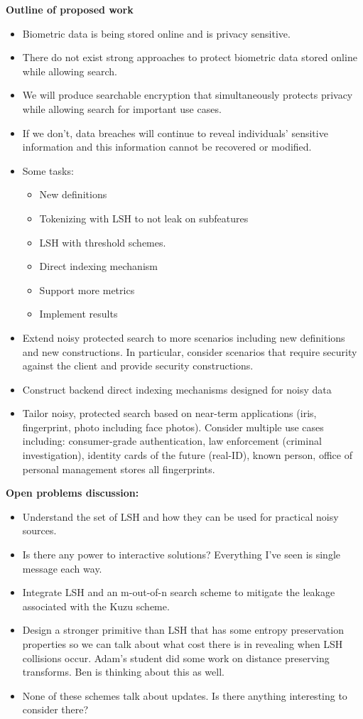 \textbf{Outline of proposed work}
\begin{itemize}
\item Biometric data is being stored online and is privacy sensitive.
\item There do not exist strong approaches to protect biometric data stored online while allowing search.
\item We will produce searchable encryption that simultaneously protects privacy while allowing search for important use cases.
\item If we don't, data breaches will continue to reveal individuals' sensitive information and this information cannot be recovered or modified.
\item Some tasks:
\begin{itemize}
\item New definitions
\item Tokenizing with LSH to not leak on subfeatures
\item LSH with threshold schemes.
\item Direct indexing mechanism
\item Support more metrics
\item Implement results
\end{itemize}
\item Extend noisy protected search to more scenarios including new definitions and new constructions.  In particular, consider scenarios that require security against the client and provide security constructions.
\item Construct backend direct indexing mechanisms designed for noisy data
\item Tailor noisy, protected search based on near-term applications (iris, fingerprint, photo including face photos).  Consider multiple use cases including: consumer-grade authentication, law enforcement (criminal investigation), identity cards of the future (real-ID), known person, office of personal management stores all fingerprints.
\end{itemize}


\textbf{Open problems discussion:} 
\begin{itemize}
\item Understand the set of LSH and how they can be used for practical noisy sources.
\item Is there any power to interactive solutions?  Everything I've seen is single message each way.
\item Integrate LSH and an m-out-of-n search scheme to mitigate the leakage associated with the Kuzu scheme.
\item Design a stronger primitive than LSH that has some entropy preservation properties so we can talk about what cost there is in revealing when LSH collisions occur.  Adam's student did some work on distance preserving transforms.  Ben is thinking about this as well.  
\item None of these schemes talk about updates.  Is there anything interesting to consider there?
\end{itemize}

